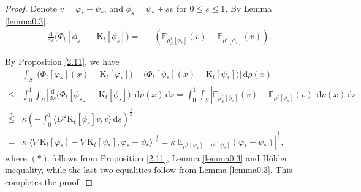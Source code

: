 \documentclass[a4paper,11pt]{article}
\numberwithin{equation}{section}
\theoremstyle{plain}
\theoremstyle{definition}
\theoremstyle{remark}
\newcommand{\E}{\mathbb{E}}
\newcommand{\K}{\mathrm{K}}
\renewcommand{\d}{{\mathrm d}}
\begin{document}
	\begin{proof}
		
		
		Denote $v=\varphi_{*}-\psi_{*}$,  and $ \phi_{s}=\psi_{*}+sv$ for $0\leq s\leq1$. 
		By Lemma \ref{lemma0.3}, 
		\begin{equation}
			\begin{aligned}
				\frac{\d}{\d s}\Big({\Phi}_t[\phi_{s}]-\K_t[\phi_{s}]\Big)=&-\left(\E_{\mu_x^t[\phi_{s}]}(v)-\E_{\mu^t[\phi_{s}]}(v) \right).
			\end{aligned}
		\end{equation}
		
		By Proposition \ref{2.11},  we have  
	    \begin{equation*}
	    	\begin{aligned}
	    		&\int_{S}\left|\Big(\Phi_t[\varphi_{*}](x)-\K_t[\varphi_{*}]\Big)-\Big(\Phi_t[\psi_{*}](x)-\K_t[\psi_{*}]\Big)\right|\,\d\rho(x)\\
	    		\leq &\int_0^1\int_S \left| \frac{\d}{\d s}\Big({\Phi}_t[\phi_{s}]-\K_t[\phi_{s}]\Big)\right|\,\d\rho(x)\,\d s
	    		= \int_0^1\int_S \left|\E_{\mu_x^t[\phi_{s}]}(v)-\E_{\mu^t[\phi_{s}]}(v) \right|\,\d\rho(x)\,\d s\\
	    		\overset{*}{\leq} &\kappa\left(-\int_0^1\langle D^2{\K}_t[\phi_{s}]v, v\rangle\,\d s\right)^\frac{1}{2}\\
	    		= &\kappa\left|\langle \nabla {\K}_t[\varphi_{*}]-\nabla {\K}_t[\psi_{*}], \varphi_{*}-\psi_{*}\rangle\right|^\frac{1}{2}
	    		=\kappa\left| \E_{\mu^t[\varphi_{*}]-\mu^t[\psi_{*}]}(\varphi_{*}-\psi_{*})\right|^\frac{1}{2},
	    	\end{aligned}
	    \end{equation*}
	       where $(*)$ follows from Proposition \ref{2.11},  Lemma \ref{lemma0.3} and H\"older inequality, while the last two equalities follow from  Lemma \ref{lemma0.3}.  This completes the proof.
	\end{proof}
	
\end{document}
